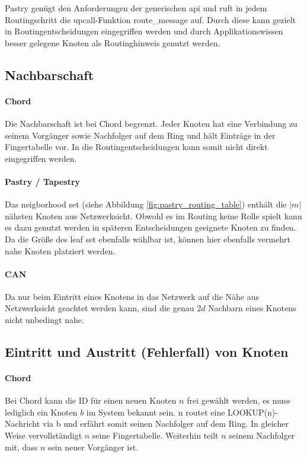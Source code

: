 Pastry genügt den Anforderungen der generischen \ac{api} und ruft in jedem Routingschritt die upcall-Funktion route\_message auf. Durch diese kann gezielt in Routingentscheidungen eingegriffen werden und durch Applikationswissen besser gelegene Knoten als Routinghinweis genutzt werden.

\subsection{Nachbarschaft}
\paragraph{Chord}
Die Nachbarschaft ist bei Chord begrenzt. Jeder Knoten hat eine Verbindung zu seinem Vorgänger sowie Nachfolger auf dem Ring und hält Einträge in der Fingertabelle vor. In die Routingentscheidungen kann somit nicht direkt eingegriffen werden.


\paragraph{Pastry / Tapestry}
Das neigborhood set (siehe Abbildung \ref{fig:pastry_routing_table}) enthält die $|m|$ nähsten Knoten aus Netzwerksicht. Obwohl es im Routing keine Rolle spielt kann es dazu genutzt werden in späteren Entscheidungen geeignete Knoten zu finden.\\
Da die Größe des leaf set ebenfalls wählbar ist, können hier ebenfalls vermehrt nahe Knoten platziert werden.


\paragraph{CAN}
Da nur beim Eintritt eines Knotens in das Netzwerk auf die Nähe aus Netzwerksicht geachtet werden kann, sind die genau $2d$ Nachbarn eines Knotens nicht unbedingt nahe.

\subsection{Eintritt und Austritt (Fehlerfall) von Knoten}
\paragraph{Chord}
Bei Chord kann die ID für einen neuen Knoten $n$ frei gewählt werden, es muss lediglich ein Knoten $b$ im System bekannt sein. n routet eine LOOKUP(n)-Nachricht via b und erfährt somit seinen Nachfolger auf dem Ring. In gleicher Weise vervollständigt $n$ seine Fingertabelle. Weiterhin teilt $n$ seinem Nachfolger mit, dass $n$ sein neuer Vorgänger ist.

